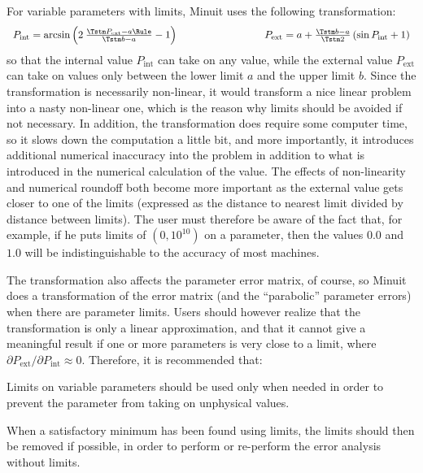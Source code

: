 
For variable parameters with limits, Minuit uses the following transformation:
$$
\begin{array}{l@{\hspace{3cm}}l}
P_{\mathrm{int}} = \arcsin
        \left( 2\: \frac{\Tstm P_{\mathrm{ext}}-a\Rule}{\Tstm b-a} - 1 \right)       &
P_{\mathrm{ext}} = a + \frac{\Tstm b - a}{\Tstm 2}
        \left( \sin P_{\mathrm{int}} + 1 \right)                  \\
\end{array}
$$
so that the internal value $P_{\mathrm{int}}$ can take on any value, while
the external value $P_{\mathrm{ext}}$ can take on values only between the lower
limit $a$ and the upper limit $b$.
Since the transformation is necessarily non-linear, it would transform a
nice linear problem into a nasty non-linear one, which is the reason why
limits should be avoided if not necessary. 
In addition, the transformation
does require some computer time, so it slows down the computation a little
bit, and more importantly, it introduces additional numerical inaccuracy into
the problem in addition to what is introduced in the numerical calculation
of the  value.  
The effects of non-linearity and numerical roundoff both
become more important as the external value gets closer to one of the limits
(expressed as the distance to nearest limit divided by distance between limits).
The user must therefore be aware of the fact that, for example,
if he puts limits of $(0,10^{10})$ on a parameter, then the values $0.0$ 
and $1.0$ will be indistinguishable to the accuracy of most machines.

The transformation also affects the parameter error matrix, of course,
so Minuit does a transformation of the error matrix (and the 
``parabolic'' parameter errors) when there are parameter limits.
Users should however realize that the transformation is only a linear
approximation, and that it cannot give a meaningful result if one or more
parameters is very close to a limit, where
$\partial P_{\mathrm{ext}} / \partial P_{\mathrm{int}} \approx 0$.
Therefore, it is recommended that:
\begin{UL}
\item Limits on variable parameters should be used only when needed in order
to prevent the parameter from taking on unphysical values.
\item When a satisfactory minimum has been found using limits, the limits
should then be removed if possible, in order to perform or re-perform the
error analysis without limits.
\end{UL}

